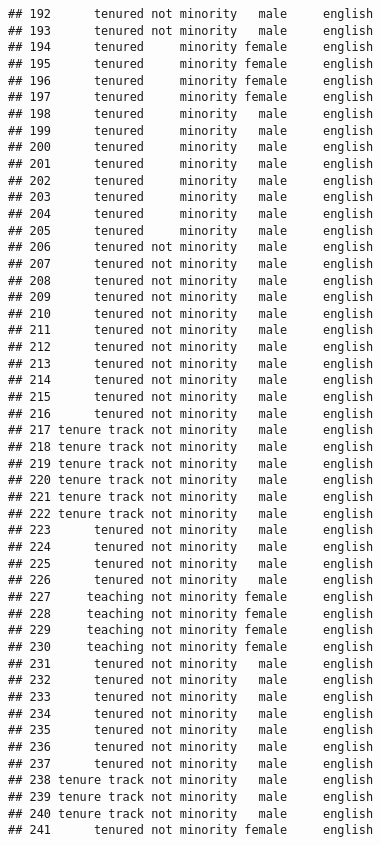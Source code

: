 \documentclass[
]{article}
\begin{document}
\begin{verbatim}
## 192      tenured not minority   male     english
## 193      tenured not minority   male     english
## 194      tenured     minority female     english
## 195      tenured     minority female     english
## 196      tenured     minority female     english
## 197      tenured     minority female     english
## 198      tenured     minority   male     english
## 199      tenured     minority   male     english
## 200      tenured     minority   male     english
## 201      tenured     minority   male     english
## 202      tenured     minority   male     english
## 203      tenured     minority   male     english
## 204      tenured     minority   male     english
## 205      tenured     minority   male     english
## 206      tenured not minority   male     english
## 207      tenured not minority   male     english
## 208      tenured not minority   male     english
## 209      tenured not minority   male     english
## 210      tenured not minority   male     english
## 211      tenured not minority   male     english
## 212      tenured not minority   male     english
## 213      tenured not minority   male     english
## 214      tenured not minority   male     english
## 215      tenured not minority   male     english
## 216      tenured not minority   male     english
## 217 tenure track not minority   male     english
## 218 tenure track not minority   male     english
## 219 tenure track not minority   male     english
## 220 tenure track not minority   male     english
## 221 tenure track not minority   male     english
## 222 tenure track not minority   male     english
## 223      tenured not minority   male     english
## 224      tenured not minority   male     english
## 225      tenured not minority   male     english
## 226      tenured not minority   male     english
## 227     teaching not minority female     english
## 228     teaching not minority female     english
## 229     teaching not minority female     english
## 230     teaching not minority female     english
## 231      tenured not minority   male     english
## 232      tenured not minority   male     english
## 233      tenured not minority   male     english
## 234      tenured not minority   male     english
## 235      tenured not minority   male     english
## 236      tenured not minority   male     english
## 237      tenured not minority   male     english
## 238 tenure track not minority   male     english
## 239 tenure track not minority   male     english
## 240 tenure track not minority   male     english
## 241      tenured not minority female     english

\end{verbatim}
\end{document}
